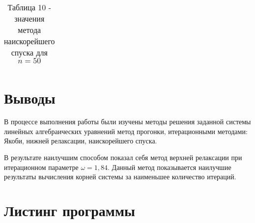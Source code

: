 \documentclass[a4paper,12pt]{article}
\begin{document}
{\begin{table}[h]
\begin{tabular}{|c|c|c|c|c|}
    \end{tabular}
    \caption*{\small{Таблица 10 - значения метода наискорейшего спуска для $n = 50$}}
\end{table}
\clearpage
\section{Выводы}
\hspace{1.25cm}В процессе выполнения работы были изучены методы решения заданной системы линейных алгебраических 
уравнений метод прогонки, итерационными методами: Якоби, нижней релаксации, наискорейшего спуска.

В результате наилучшим способом показал себя  метод верхней релаксации при итера\-ционном параметре $\omega = 1,84$. 
Данный метод показывается наилучшие результаты вычисле\-ния корней системы за наименьшее количество итераций.
}
\clearpage
\section{Листинг программы}

\end{document}
